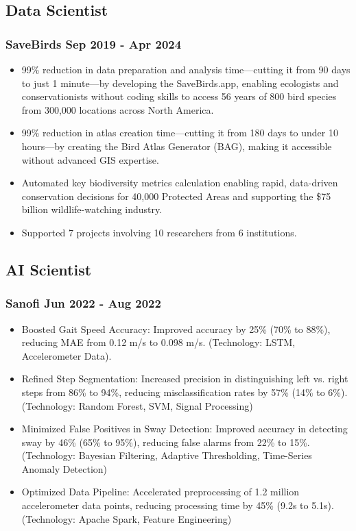\documentclass[11pt]{article} %
\begin{document}
\subsection{Data Scientist}
\subsubsection{SaveBirds \hfill Sep 2019 - Apr 2024}
\begin{itemize}
	\item 99\% reduction in data preparation and analysis time—cutting it from 90 days to just 1 minute—by developing the SaveBirds.app, enabling ecologists and conservationists without coding skills to access 56 years of 800 bird species from 300,000 locations across North America.
	\item 99\% reduction in atlas creation time—cutting it from 180 days to under 10 hours—by creating the Bird Atlas Generator (BAG), making it accessible without advanced GIS expertise.
	\item Automated key biodiversity metrics calculation enabling rapid, data-driven conservation decisions for 40,000 Protected Areas and supporting the \$75 billion wildlife-watching industry.
	\item Supported 7 projects involving 10 researchers from 6 institutions.
\end{itemize}

\subsection{AI Scientist}
\subsubsection{Sanofi \hfill Jun 2022 - Aug 2022}
\begin{itemize}
	\item Boosted Gait Speed Accuracy: Improved accuracy by 25\% (70\% to 88\%), reducing MAE from 0.12 m/s to 0.098 m/s. (Technology: LSTM, Accelerometer Data).
	\item Refined Step Segmentation: Increased precision in distinguishing left vs. right steps from 86\% to 94\%, reducing misclassification rates by 57\% (14\% to 6\%). (Technology: Random Forest, SVM, Signal Processing)	
	\item Minimized False Positives in Sway Detection: Improved accuracy in detecting sway by 46\% (65\% to 95\%), reducing false alarms from 22\% to 15\%. (Technology: Bayesian Filtering, Adaptive Thresholding, Time-Series Anomaly Detection) 
	\item Optimized Data Pipeline: Accelerated preprocessing of 1.2 million accelerometer data points, reducing processing time by 45\% (9.2s to 5.1s). (Technology: Apache Spark, Feature Engineering)
\end{itemize}
\end{document}
